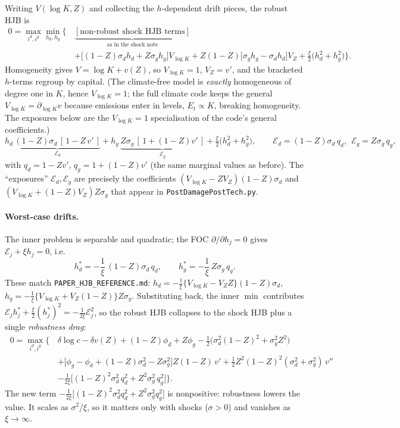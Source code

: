 \documentclass[11pt]{article}
\newcommand{\xicap}{\xi}
\begin{document}
Writing $V(\log K,Z)$ and collecting the $h$-dependent drift pieces, the robust HJB is
\begin{align*}
0=\max_{i^d,i^g}\min_{h_d,h_g}\Big\{\,
&\underbrace{[\text{non-robust shock HJB terms}]}_{\text{as in the shock note}}\\
&+\Big[(1-Z)\sigma_d h_d+Z\sigma_g h_g\Big]V_{\log K}
+Z(1-Z)\big[\sigma_g h_g-\sigma_d h_d\big]V_Z
+\tfrac{\xicap}{2}\big(h_d^2+h_g^2\big)\Big\}.
\end{align*}
Homogeneity gives $V=\log K+v(Z)$, so $V_{\log K}=1$, $V_Z=v'$, and the bracketed
$h$-terms regroup by capital. (The climate-free model is \emph{exactly} homogeneous of
degree one in $K$, hence $V_{\log K}=1$; the full climate code keeps the general
$V_{\log K}=\partial_{\log K}v$ because emissions enter in levels, $E_t\propto K$, breaking
homogeneity. The exposures below are the $V_{\log K}=1$ specialisation of the code's
general coefficients.)
\[
h_d\,\underbrace{(1-Z)\sigma_d\,[\,1-Z\,v'\,]}_{\displaystyle \mathcal E_d}
+h_g\,\underbrace{Z\sigma_g\,[\,1+(1-Z)v'\,]}_{\displaystyle \mathcal E_g}
+\tfrac{\xicap}{2}\big(h_d^2+h_g^2\big),
\qquad
\mathcal E_d=(1-Z)\sigma_d\,q_d,\ \ \mathcal E_g=Z\sigma_g\,q_g,
\]
with $q_d=1-Zv'$, $q_g=1+(1-Z)v'$ (the same marginal values as before). The
``exposures'' $\mathcal E_d,\mathcal E_g$ are precisely the coefficients
$(V_{\log K}-ZV_Z)(1-Z)\sigma_d$ and $(V_{\log K}+(1-Z)V_Z)Z\sigma_g$ that appear in
\texttt{PostDamagePostTech.py}.

\paragraph{Worst-case drifts.} The inner problem is separable and quadratic; the FOC
$\partial/\partial h_j=0$ gives $\mathcal E_j+\xicap h_j=0$, i.e.
\[
\boxed{\;
h_d^\ast=-\frac{1}{\xicap}\,(1-Z)\sigma_d\,q_d,
\qquad
h_g^\ast=-\frac{1}{\xicap}\,Z\sigma_g\,q_g.
\;}
\]
These match \texttt{PAPER\_HJB\_REFERENCE.md}:
$h_d=-\tfrac1{\xicap}\{V_{\log K}-V_Z Z\}(1-Z)\sigma_d$,
$h_g=-\tfrac1{\xicap}\{V_{\log K}+V_Z(1-Z)\}Z\sigma_g$. Substituting back, the inner
$\min$ contributes $\mathcal E_j h_j^\ast+\tfrac{\xicap}{2}(h_j^\ast)^2=-\tfrac{1}{2\xicap}\mathcal E_j^2$,
so the robust HJB collapses to the shock HJB plus a single \emph{robustness drag}:
\[
\boxed{\
\begin{aligned}
0=\max_{i^d,i^g}\Big\{\,&\delta\log c-\delta v(Z)
+(1-Z)\phi_d+Z\phi_g-\tfrac12\big(\sigma_d^2(1-Z)^2+\sigma_g^2Z^2\big)\\
&+\big[\phi_g-\phi_d+(1-Z)\sigma_d^2-Z\sigma_g^2\big]Z(1-Z)\,v'
+\tfrac12Z^2(1-Z)^2(\sigma_d^2+\sigma_g^2)\,v''\\
&-\frac{1}{2\xicap}\Big[(1-Z)^2\sigma_d^2\,q_d^2+Z^2\sigma_g^2\,q_g^2\Big]\Big\}.
\end{aligned}\ }
\]
The new term $-\tfrac{1}{2\xicap}\big[(1-Z)^2\sigma_d^2 q_d^2+Z^2\sigma_g^2 q_g^2\big]$
is nonpositive: robustness lowers the value. It scales as $\sigma^2/\xicap$, so it
matters only with shocks ($\sigma>0$) and vanishes as $\xicap\to\infty$.
\end{document}
